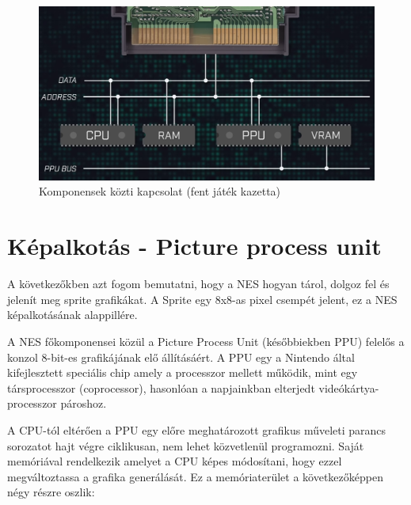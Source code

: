 	\begin{figure}[H]
		\centering
		\includegraphics[width=120mm, keepaspectratio]{figures/NES-databuses}
		\caption{Komponensek közti kapcsolat (fent játék kazetta) \cite{NES_hardware}}
		\label{fig:NES-Data-Buses}
	\end{figure}
	

\section{Képalkotás - Picture process unit}
\label{PPU-irodalom}

A következőkben azt fogom bemutatni, hogy a NES hogyan tárol, dolgoz fel és jelenít meg sprite grafikákat. A Sprite egy 8x8-as pixel csempét jelent, ez a NES képalkotásának alappillére.

A NES főkomponensei közül a Picture Process Unit (későbbiekben PPU) felelős a konzol 8-bit-es grafikájának elő állításáért. A PPU egy a Nintendo által kifejlesztett speciális chip amely a processzor mellett működik, mint egy társprocesszor (coprocessor), hasonlóan a napjainkban elterjedt videókártya-processzor pároshoz.

A CPU-tól eltérően a PPU egy előre meghatározott grafikus műveleti parancs sorozatot hajt végre ciklikusan, nem lehet közvetlenül programozni. Saját memóriával rendelkezik
amelyet a CPU képes módosítani, hogy ezzel megváltoztassa a grafika generálását. Ez a memóriaterület a következőképpen négy részre oszlik:

